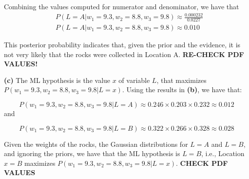 \documentclass[leqno]{article}
\begin{document}
\noindent Combining the values computed for numerator and denominator, we have that
\begin{equation*}
\begin{split}
&P(L = A| w_1 = 9.3, w_2 = 8.8, w_3 = 9.8) \approx \frac{0.000232}{0.0227}
\\
&P(L = A| w_1 = 9.3, w_2 = 8.8, w_3 = 9.8) \approx 0.010
\end{split}
\end{equation*}

\noindent This posterior probability indicates that, given the prior and the evidence, it is not very likely that the rocks were collected in Location A.
\textbf{RE-CHECK PDF VALUES!}

\noindent \textbf{(c)} The ML hypothesis is the value $x$ of variable $L$, that maximizes $P(w_1 = 9.3, w_2 = 8.8, w_3 = 9.8| L = x)$. Using the results in
\textbf{(b)}, we have that:

\begin{equation*}
P(w_1 = 9.3, w_2 = 8.8, w_3 = 9.8| L = A) \approx 0.246 \times 0.203 \times 0.232 \approx 0.012
\end{equation*}
and

\begin{equation*}
P(w_1 = 9.3, w_2 = 8.8, w_3 = 9.8| L = B) \approx 0.322 \times 0.266 \times 0.328 \approx 0.028
\end{equation*}

\noindent Given the weights of the rocks, the Gaussian distributions for $L = A$ and $L = B$, and ignoring the priors, we have that
the ML hypothesis is $L = B$, i.e., Location $x = B$ maximizes $P(w_1 = 9.3, w_2 = 8.8, w_3 = 9.8| L = x)$. \textbf{CHECK PDF VALUES}
  
\end{document}

